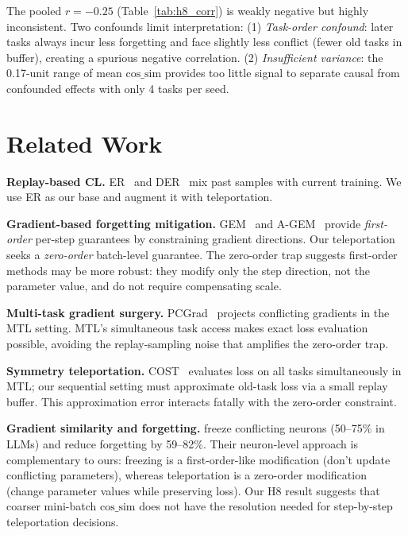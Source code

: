 \documentclass[11pt,a4paper]{article}
\newcommand{\cossim}{\mathrm{cos\_sim}}
\begin{document}
The pooled $r = -0.25$ (Table~\ref{tab:h8_corr}) is weakly negative but highly inconsistent.
Two confounds limit interpretation:
(1) \emph{Task-order confound}: later tasks always incur less forgetting and face slightly
    less conflict (fewer old tasks in buffer), creating a spurious negative correlation.
(2) \emph{Insufficient variance}: the 0.17-unit range of mean $\cossim$ provides too little
    signal to separate causal from confounded effects with only 4 tasks per seed.

\section{Related Work}
\label{sec:related}

\textbf{Replay-based CL.}
ER~\citep{rolnick2019er} and DER~\citep{buzzega2020der} mix past samples with current training.
We use ER as our base and augment it with teleportation.

\textbf{Gradient-based forgetting mitigation.}
GEM~\citep{lopezpaz2017gem} and A-GEM~\citep{chaudhry2019agem} provide \emph{first-order}
per-step guarantees by constraining gradient directions.
Our teleportation seeks a \emph{zero-order} batch-level guarantee.
The zero-order trap suggests first-order methods may be more robust: they modify only
the step direction, not the parameter value, and do not require compensating scale.

\textbf{Multi-task gradient surgery.}
PCGrad~\citep{yu2020pcgrad} projects conflicting gradients in the MTL setting.
MTL's simultaneous task access makes exact loss evaluation possible, avoiding the
replay-sampling noise that amplifies the zero-order trap.

\textbf{Symmetry teleportation.}
COST~\citep{zhou2025cost} evaluates loss on all tasks simultaneously in MTL;
our sequential setting must approximate old-task loss via a small replay buffer.
This approximation error interacts fatally with the zero-order constraint.

\textbf{Gradient similarity and forgetting.}
\citet{liu2026gradconflict} freeze conflicting neurons (50--75\% in LLMs) and reduce
forgetting by 59--82\%.
Their neuron-level approach is complementary to ours: freezing is a first-order-like
modification (don't update conflicting parameters), whereas teleportation is a zero-order
modification (change parameter values while preserving loss).
Our H8 result suggests that coarser mini-batch $\cossim$ does not have the resolution
needed for step-by-step teleportation decisions.
\end{document}
